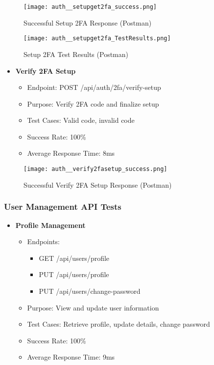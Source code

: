 \begin{figure}[h!]
    \centering
    \texttt{[image: auth\_\_setupget2fa\_success.png]}
    \caption{Successful Setup 2FA Response (Postman)}
    \label{fig:auth_setup2fa_success}
\end{figure}

\begin{figure}[h!]
    \centering
    \texttt{[image: auth\_\_setupget2fa\_TestResults.png]}
    \caption{Setup 2FA Test Results (Postman)}
    \label{fig:auth_setup2fa_testresults}
\end{figure}

\begin{itemize}
    \item \textbf{Verify 2FA Setup}
    \begin{itemize}
        \item Endpoint: POST /api/auth/2fa/verify-setup
        \item Purpose: Verify 2FA code and finalize setup
        \item Test Cases: Valid code, invalid code
        \item Success Rate: 100\%
        \item Average Response Time: 8ms
    \end{itemize}
\end{itemize}

\begin{figure}[h!]
    \centering
    \texttt{[image: auth\_\_verify2fasetup\_success.png]}
    \caption{Successful Verify 2FA Setup Response (Postman)}
    \label{fig:auth_verify2fasetup_success}
\end{figure}

\subsubsection{User Management API Tests}
\begin{itemize}
    \item \textbf{Profile Management}
    \begin{itemize}
        \item Endpoints: 
        \begin{itemize}
            \item GET /api/users/profile
            \item PUT /api/users/profile
            \item PUT /api/users/change-password
        \end{itemize}
        \item Purpose: View and update user information
        \item Test Cases: Retrieve profile, update details, change password
        \item Success Rate: 100\%
        \item Average Response Time: 9ms
    \end{itemize}
\end{itemize}

